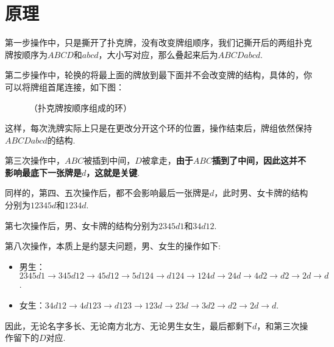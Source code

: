 \documentclass[10pt]{article}
\begin{document}
\section*{原理}
第一步操作中，只是撕开了扑克牌，没有改变牌组顺序，我们记撕开后的两组扑克牌按顺序为$ABCD$和$abcd$，大小写对应，那么叠起来后为$ABCDabcd$. \par
第二步操作中，轮换的将最上面的牌放到最下面并不会改变牌的结构，具体的，你可以将牌组首尾连接，如下图：\par
\begin{figure}[!htb]
    \centering
    \caption*{（扑克牌按顺序组成的环）}
\end{figure}
这样，每次洗牌实际上只是在更改分开这个环的位置，操作结束后，牌组依然保持$ABCDabcd$的结构. \par
第三次操作中，$ABC$被插到中间，$D$被拿走，\textbf{由于$ABC$插到了中间，因此这并不影响最底下一张牌是$d$，这就是关键}. \par
同样的，第四、五次操作后，都不会影响最后一张牌是$d$，此时男、女卡牌的结构分别为$12345d$和$1234d$.\par
第七次操作后，男、女卡牌的结构分别为$2345d1$和$34d12$.\par
第八次操作，本质上是约瑟夫问题，男、女生的操作如下:\par
\begin{itemize}
    \item 男生：$2345d1 \longrightarrow 345d12 \longrightarrow 45d12 \longrightarrow 5d124 \longrightarrow d124 \longrightarrow 124d \longrightarrow 24d \longrightarrow 4d2 \longrightarrow d2 \longrightarrow 2d \longrightarrow d$.
    \item 女生：$34d12 \longrightarrow 4d123 \longrightarrow d123 \longrightarrow 123d \longrightarrow 23d \longrightarrow 3d2 \longrightarrow d2 \longrightarrow 2d \longrightarrow d$.
\end{itemize} \par
因此，无论名字多长、无论南方北方、无论男生女生，最后都剩下$d$，和第三次操作留下的$D$对应.
\end{document}
